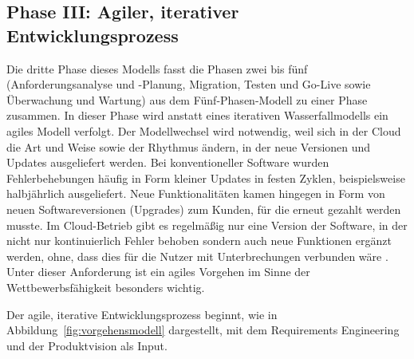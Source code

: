\begin{comment}
\subsubsection{Technische Machbarkeit}


\subsubsection{Wirtschaftliche Machbarkeit}
"`In diesem Punkt unterscheidet sich Cloud-Computing von früheren Paradigmen
wie Outsourcing, welches nicht auf das Geschäftsmodell des Unternehmens wirken
will. Durch neue Anwendungsszenarien kann mit Cloud-Computing ein beachtlicher
Mehrwert geschaffen werden."' \pcite{}{154}{cloud_migration}

"`Alle Empfehlungen sollten mit einem Business Case hinterlegt werden, der
die Höhe der Kostenreduktion und die Verbesserung des Servicelevels zeigt."'
\pcite{}{158}{cloud_migration}
\end{comment}


\subsection{Phase III: Agiler, iterativer Entwicklungsprozess}
Die dritte Phase dieses Modells fasst die Phasen zwei bis fünf 
(Anforderungsanalyse und -Planung, Migration, Testen und Go-Live sowie 
Überwachung und Wartung) aus dem Fünf-Phasen-Modell zu einer Phase zusammen. In 
dieser Phase wird anstatt eines iterativen Wasserfallmodells ein agiles Modell verfolgt. Der Modellwechsel wird 
notwendig, weil sich in der Cloud die Art und Weise sowie der Rhythmus ändern, 
in der neue Versionen und Updates ausgeliefert werden. Bei konventioneller 
Software wurden Fehlerbehebungen häufig in Form kleiner Updates in festen 
Zyklen, beispielsweise halbjährlich ausgeliefert. Neue Funktionalitäten kamen 
hingegen in Form von neuen Softwareversionen (Upgrades) zum Kunden, für die 
erneut gezahlt werden musste. Im Cloud-Betrieb gibt es regelmäßig  nur eine 
Version der Software, in der nicht nur kontinuierlich Fehler behoben 
sondern auch neue Funktionen ergänzt werden, ohne, dass dies für die Nutzer mit 
Unterbrechungen verbunden wäre 
. Unter dieser Anforderung ist ein agiles Vorgehen im Sinne der Wettbewerbsfähigkeit 
besonders wichtig.

Der agile, iterative Entwicklungsprozess beginnt, wie in 
Abbildung~\ref{fig:vorgehensmodell} dargestellt, mit dem Requirements 
Engineering und der Produktvision als Input.

